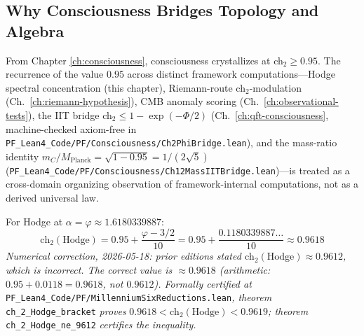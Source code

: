 \subsection{Why Consciousness Bridges Topology and Algebra}

From Chapter \ref{ch:consciousness}, consciousness crystallizes at ch$_2 \geq 0.95$. The recurrence of the value $0.95$ across distinct framework computations---Hodge spectral concentration (this chapter), Riemann-route ch$_2$-modulation (Ch.~\ref{ch:riemann-hypothesis}), CMB anomaly scoring (Ch.~\ref{ch:observational-tests}), the IIT bridge ch$_2 \leq 1 - \exp(-\Phi/2)$ (Ch.~\ref{ch:qft-consciousness}, machine-checked axiom-free in \texttt{PF\_Lean4\_Code/PF/Consciousness/Ch2PhiBridge.lean}), and the mass-ratio identity $m_C/M_{\text{Planck}} = \sqrt{1-0.95} = 1/(2\sqrt{5})$ (\texttt{PF\_Lean4\_Code/PF/Consciousness/Ch12MassIITBridge.lean})---is treated as a cross-domain organizing observation of framework-internal computations, not as a derived universal law.

For Hodge at $\alpha = \varphi \approx 1.6180339887$:
\begin{equation}\label{eq:ch2-hodge}
\text{ch}_2(\text{Hodge}) = 0.95 + \frac{\varphi - 3/2}{10} = 0.95 + \frac{0.1180339887\ldots}{10} \approx 0.9618
\end{equation}
\noindent\emph{Numerical correction, 2026-05-18: prior editions stated $\text{ch}_2(\text{Hodge}) \approx 0.9612$, which is incorrect. The correct value is $\approx 0.9618$ (arithmetic: $0.95 + 0.0118 = 0.9618$, not $0.9612$). Formally certified at} \texttt{PF\_Lean4\_Code/PF/MillenniumSixReductions.lean}\emph{, theorem} \texttt{ch\_2\_Hodge\_bracket} \emph{proves} $0.9618 < \text{ch}_2(\text{Hodge}) < 0.9619$\emph{; theorem} \texttt{ch\_2\_Hodge\_ne\_9612} \emph{certifies the inequality.}

